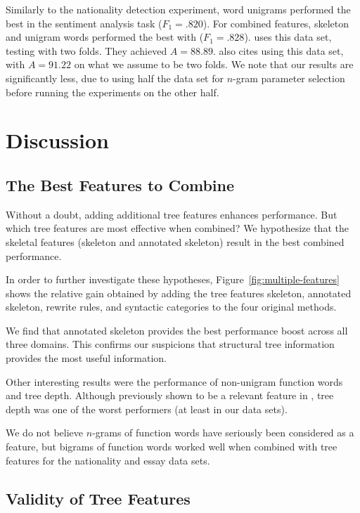 \documentclass[conference]{IEEEtran}
\begin{document}
Similarly to the nationality detection experiment, word unigrams performed the
best in the sentiment analysis task ($F_1 = .820$). For combined features,
skeleton and unigram words performed the best with ($F_1 = .828$).
\cite{acl-maas-2011} uses this data set, testing with two folds. They achieved
$A=88.89$. \cite{acl-wang-2012} also cites using this data set, with $A = 91.22$
on what we assume to be two folds. We note that our results are significantly
less, due to using half the data set for $n$-gram parameter selection before
running the experiments on the other half.

\section{Discussion}

\subsection{The Best Features to Combine}

Without a doubt, adding additional tree features enhances performance. But which
tree features are most effective when combined? We hypothesize that the skeletal
features (skeleton and annotated skeleton) result in the best combined
performance.

In order to further investigate these hypotheses,
Figure~\ref{fig:multiple-features} shows the relative gain obtained by adding
the tree features skeleton, annotated skeleton, rewrite rules, and syntactic
categories to the four original methods.



We find that annotated skeleton provides the best performance boost across all
three domains. This confirms our suspicions that structural tree information
provides the most useful information.

Other interesting results were the performance of non-unigram function words and
tree depth. Although previously shown to be a relevant feature
in \cite{acl-chen-2011}, tree depth was one of the worst performers (at least
in our data sets).

We do not believe $n$-grams of function words have seriously been considered as
a feature, but bigrams of function words worked well when combined with tree
features for the nationality and essay data sets. 

\subsection{Validity of Tree Features}
\end{document}
